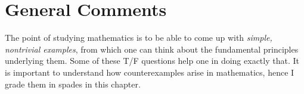 \documentclass[answers,11pt]{exam}
\theoremstyle{definition}
\theoremstyle{definition}
\DeclareMathOperator{\1}{\mathbbm{1}}
\begin{document}
\clearpage


\section*{General Comments}

The point of studying mathematics is to be able to come up with \textit{simple, nontrivial examples}, from which one can think about the fundamental principles underlying them. Some of these T/F questions help one in doing exactly that. It is important to understand how counterexamples arise in mathematics, hence I grade them in spades in this chapter.
\end{document}
